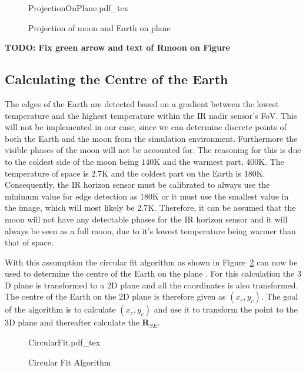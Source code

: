 \begin{figure}[!hbt]
	\centering
	\def\svgwidth{14cm}
	{ProjectionOnPlane.pdf_tex}
	\caption{Projection of moon and Earth on plane}
	\label{fig:ProjectionOnPlane}
\end{figure}

\textbf{TODO: Fix green arrow and text of Rmoon on Figure}

\subsection{Calculating the Centre of the Earth}
\label{section: Calculating the Centre of the Earth}
The edges of the Earth are detected based on a gradient between the lowest temperature and the highest temperature within the IR nadir sensor's FoV. This will not be implemented in our case, since we can determine discrete points of both the Earth and the moon from the simulation environment. Furthermore the visible phases of the moon will not be accounted for. The reasoning for this is due to the coldest side of the moon being $140$K and the warmest part, $400$K. The temperature of space is $\num{2.7}$K and the coldest part on the Earth is $180$K. Consequently, the IR horizon sensor must be calibrated to always use the minimum value for edge detection as $180$K or it must use the smallest value in the image, which will most likely be $2.7$K. Therefore, it can be assumed that the moon will not have any detectable phases for the IR horizon sensor and it will always be seen as a full moon, due to it's lowest temperature being warmer than that of space. 

With this assumption the circular fit algorithm as shown in Figure~\ref{fig:CircularFit} can now be used to determine the centre of the Earth on the plane \cite{wessels2018infrared}. For this calculation the $3$D plane is transformed to a $2$D plane and all the coordinates is also transformed. The centre of the Earth on the 2D plane is therefore given as $\left(x_c, y_c\right)$. The goal of the algorithm is to calculate $\left(x_c, y_c\right)$ and use it to transform the point to the 3D plane and thereafter calculate the $\mathbf{R}_{SE}$.

\begin{figure}[!hbt]
	\centering
	\def\svgwidth{14cm}
	{CircularFit.pdf_tex}
	\caption{Circular Fit Algorithm}
	\label{fig:CircularFit}
\end{figure}

